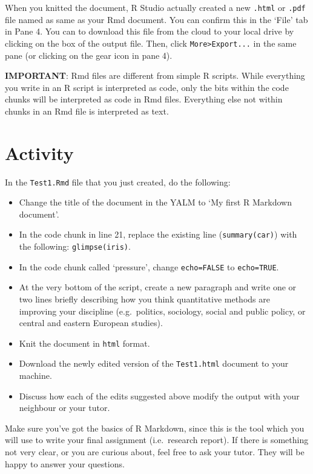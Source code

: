 \documentclass[
]{book}
\providecommand{\tightlist}{%
  \setlength{\itemsep}{0pt}\setlength{\parskip}{0pt}}
\begin{document}
When you knitted the document, R Studio actually created a new \texttt{.html} or \texttt{.pdf} file named as same as your Rmd document. You can confirm this in the `File' tab in Pane 4. You can to download this file from the cloud to your local drive by clicking on the box of the output file. Then, click \texttt{More\textgreater{}Export...} in the same pane (or clicking on the gear icon in pane 4).

\textbf{IMPORTANT}: Rmd files are different from simple R scripts. While everything you write in an R script is interpreted as code, only the bits within the code chunks will be interpreted as code in Rmd files. Everything else not within chunks in an Rmd file is interpreted as text.

\hypertarget{activity-5}{%
\section{Activity}\label{activity-5}}

In the \texttt{Test1.Rmd} file that you just created, do the following:

\begin{itemize}
\tightlist
\item
  Change the title of the document in the YALM to `My first R Markdown document'.
\item
  In the code chunk in line 21, replace the existing line (\texttt{summary(car)}) with the following: \texttt{glimpse(iris)}.
\item
  In the code chunk called `pressure', change \texttt{echo=FALSE} to \texttt{echo=TRUE}.
\item
  At the very bottom of the script, create a new paragraph and write one or two lines briefly describing how you think quantitative methods are improving your discipline (e.g.~politics, sociology, social and public policy, or central and eastern European studies).
\item
  Knit the document in \texttt{html} format.
\item
  Download the newly edited version of the \texttt{Test1.html} document to your machine.
\item
  Discuss how each of the edits suggested above modify the output with your neighbour or your tutor.
\end{itemize}

Make sure you've got the basics of R Markdown, since this is the tool which you will use to write your final assignment (i.e.~research report). If there is something not very clear, or you are curious about, feel free to ask your tutor. They will be happy to answer your questions.
\end{document}
